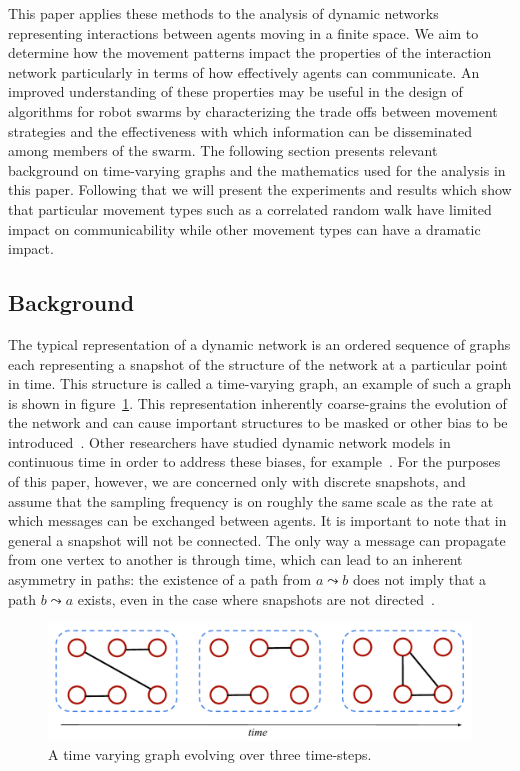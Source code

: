 \documentclass[conference]{IEEEtran}
\begin{document}
This paper applies these methods to the analysis of dynamic networks
representing interactions between agents moving in a finite space. We
aim to determine how the movement patterns impact the properties of
the interaction network particularly in terms of how effectively
agents can communicate. An improved understanding of these properties
may be useful in the design of algorithms for robot swarms by
characterizing the trade offs between movement strategies and the
effectiveness with which information can be disseminated among members
of the swarm. The following section presents relevant background on
time-varying graphs and the mathematics used for the analysis in this
paper. Following that we will present the experiments and results
which show that particular movement types such as a correlated random
walk have limited impact on communicability while other movement types
can have a dramatic impact.

\subsection{Background}
\label{subsec:bg}
The typical representation of a dynamic network is an ordered sequence
of graphs each representing a snapshot of the structure of the network
at a particular point in time. This structure is called a time-varying
graph, an example of such a graph is shown in
figure~\ref{fig:tvg}. This representation inherently coarse-grains the
evolution of the network and can cause important structures to be
masked or other bias to be introduced~\cite{Clauset2007}. Other
researchers have studied dynamic network models in continuous time in
order to address these biases, for example~\cite{Grindrod2014}. For the purposes of
this paper, however, we are concerned only with discrete snapshots,
and assume that the sampling frequency is on roughly the same scale as
the rate at which messages can be exchanged between agents. It is
important to note that in general a snapshot will not be
connected. The only way a message can propagate from one vertex to
another is through time, which can lead to an inherent asymmetry in
paths: the existence of a path from $a \leadsto b$ does not imply that
a path $b \leadsto a$ exists, even in the case where snapshots are not
directed~\cite{Tang2010}.

\begin{figure}
  \includegraphics[width=\columnwidth]{tvg}
  \caption{A time varying graph evolving over three time-steps.}
  \label{fig:tvg}
\end{figure}
\end{document}
